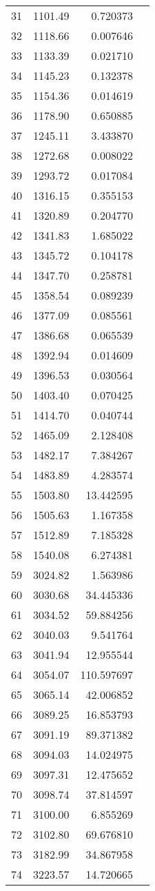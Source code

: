 \begin{tabular}{r|rr|l}
31 &  1101.49 &   0.720373  & \\
32 &  1118.66 &   0.007646  & \\
33 &  1133.39 &   0.021710  & \\
34 &  1145.23 &   0.132378  & \\
35 &  1154.36 &   0.014619  & \\
36 &  1178.90 &   0.650885  & \\
37 &  1245.11 &   3.433870  & \\
38 &  1272.68 &   0.008022  & \\
39 &  1293.72 &   0.017084  & \\
40 &  1316.15 &   0.355153  & \\
41 &  1320.89 &   0.204770  & \\
42 &  1341.83 &   1.685022  & \\
43 &  1345.72 &   0.104178  & \\
44 &  1347.70 &   0.258781  & \\
45 &  1358.54 &   0.089239  & \\
46 &  1377.09 &   0.085561  & \\
47 &  1386.68 &   0.065539  & \\
48 &  1392.94 &   0.014609  & \\
49 &  1396.53 &   0.030564  & \\
50 &  1403.40 &   0.070425  & \\
51 &  1414.70 &   0.040744  & \\
52 &  1465.09 &   2.128408  & \\
53 &  1482.17 &   7.384267  & \\
54 &  1483.89 &   4.283574  & \\
55 &  1503.80 &  13.442595  & \\
56 &  1505.63 &   1.167358  & \\
57 &  1512.89 &   7.185328  & \\
58 &  1540.08 &   6.274381  & \\
59 &  3024.82 &   1.563986  & \\
60 &  3030.68 &  34.445336  & \\
61 &  3034.52 &  59.884256  & \\
62 &  3040.03 &   9.541764  & \\
63 &  3041.94 &  12.955544  & \\
64 &  3054.07 & 110.597697  & \\
65 &  3065.14 &  42.006852  & \\
66 &  3089.25 &  16.853793  & \\
67 &  3091.19 &  89.371382  & \\
68 &  3094.03 &  14.024975  & \\
69 &  3097.31 &  12.475652  & \\
70 &  3098.74 &  37.814597  & \\
71 &  3100.00 &   6.855269  & \\
72 &  3102.80 &  69.676810  & \\
73 &  3182.99 &  34.867958  & \\
74 &  3223.57 &  14.720665  & \\
  \bottomrule
\end{tabular}

